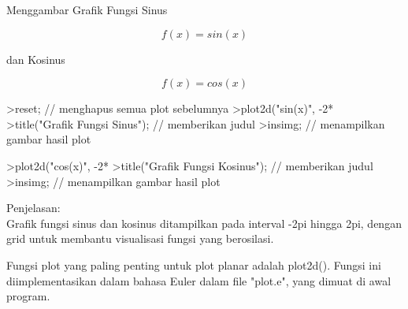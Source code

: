 \documentclass{article}
\begin{document}
\begin{eulernotebook}
\begin{eulercomment}
\begin{eulercomment}
\begin{eulercomment}
\begin{eulercomment}
\begin{eulercomment}
\begin{eulercomment}
\begin{eulercomment}
\begin{eulercomment}
\begin{eulercomment}
\begin{eulercomment}
\begin{eulercomment}
\end{eulercomment}
\eulersubheading{}
\begin{eulercomment}
Menggambar Grafik Fungsi Sinus\\
\end{eulercomment}
\begin{eulerformula}
\[
f(x)=sin(x)
\]
\end{eulerformula}
\begin{eulercomment}
dan Kosinus\\
\end{eulercomment}
\begin{eulerformula}
\[
f(x)=cos(x)
\]
\end{eulerformula}
\begin{eulerprompt}
>reset; // menghapus semua plot sebelumnya
>plot2d("sin(x)", -2*%
>title("Grafik Fungsi Sinus"); // memberikan judul
>insimg; // menampilkan gambar hasil plot
\end{eulerprompt}
\begin{eulerprompt}
>plot2d("cos(x)", -2*%
>title("Grafik Fungsi Kosinus"); // memberikan judul
>insimg; // menampilkan gambar hasil plot
\end{eulerprompt}
\begin{eulercomment}
Penjelasan:\\
Grafik fungsi sinus dan kosinus ditampilkan pada interval -2pi hingga
2pi, dengan grid untuk membantu visualisasi fungsi yang berosilasi.\\
\end{eulercomment}
\eulersubheading{}
\begin{eulercomment}
Fungsi plot yang paling penting untuk plot planar adalah plot2d().
Fungsi ini diimplementasikan dalam bahasa Euler dalam file "plot.e",
yang dimuat di awal program.


\end{eulercomment}
\end{eulercomment}
\end{eulercomment}
\end{eulercomment}
\end{eulercomment}
\end{eulercomment}
\end{eulercomment}
\end{eulercomment}
\end{eulercomment}
\end{eulercomment}
\end{eulercomment}
\end{eulernotebook}
\end{document}
